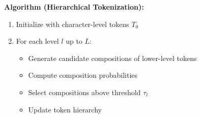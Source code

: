 \documentclass{article}
\begin{document}
\textbf{Algorithm (Hierarchical Tokenization):}
\begin{enumerate}
\item Initialize with character-level tokens $T_0$
\item For each level $l$ up to $L$:
   \begin{itemize}
   \item Generate candidate compositions of lower-level tokens
   \item Compute composition probabilities
   \item Select compositions above threshold $\tau_l$
   \item Update token hierarchy
   \end{itemize}
\end{enumerate}
\end{document}
